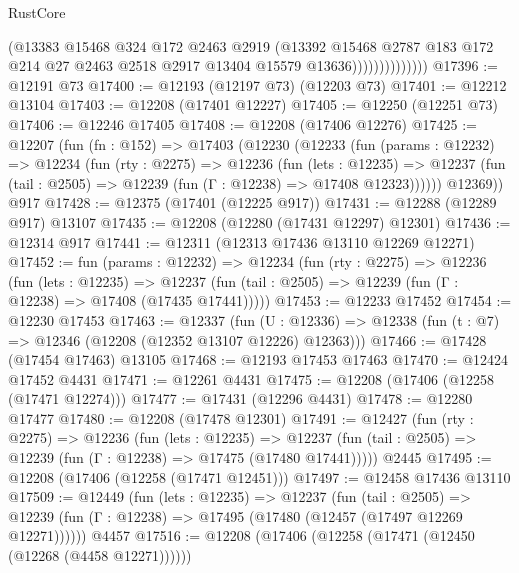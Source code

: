 \begin{lexlean}{RustCore}
\begin{coremodule}
                            (@13383
                              @15468
                              @324
                              @172
                              @2463
                              @2919
                              (@13392
                                @15468
                                @2787
                                @183
                                @172
                                @214
                                @27
                                @2463
                                @2518
                                @2917
                                @13404
                                @15579
                                @13636))))))))))))))
@17396 := @12191 @73
@17400 := @12193 (@12197 @73) (@12203 @73)
@17401 := @12212 @13104
@17403 := @12208 (@17401 @12227)
@17405 := @12250 (@12251 @73)
@17406 := @12246 @17405
@17408 := @12208 (@17406 @12276)
@17425 := @12207
    (fun (fn : @152) =>
    @17403
      (@12230
        (@12233
          (fun (params : @12232) =>
          @12234
            (fun (rty : @2275) =>
            @12236
              (fun (lets : @12235) =>
              @12237 (fun (tail : @2505) => @12239 (fun (Γ : @12238) => @17408 @12323))))))
        @12369))
    @917
@17428 := @12375 (@17401 (@12225 @917))
@17431 := @12288 (@12289 @917) @13107
@17435 := @12208 (@12280 (@17431 @12297) @12301)
@17436 := @12314 @917
@17441 := @12311 (@12313 @17436 @13110 @12269 @12271)
@17452 := fun (params : @12232) =>
  @12234
    (fun (rty : @2275) =>
    @12236
      (fun (lets : @12235) =>
      @12237 (fun (tail : @2505) => @12239 (fun (Γ : @12238) => @17408 (@17435 @17441)))))
@17453 := @12233 @17452
@17454 := @12230 @17453
@17463 := @12337
    (fun (U : @12336) => @12338 (fun (t : @7) => @12346 (@12208 (@12352 @13107 @12226) @12363)))
@17466 := @17428 (@17454 @17463) @13105
@17468 := @12193 @17453 @17463
@17470 := @12424 @17452 @4431
@17471 := @12261 @4431
@17475 := @12208 (@17406 (@12258 (@17471 @12274)))
@17477 := @17431 (@12296 @4431)
@17478 := @12280 @17477
@17480 := @12208 (@17478 @12301)
@17491 := @12427
    (fun (rty : @2275) =>
    @12236
      (fun (lets : @12235) =>
      @12237 (fun (tail : @2505) => @12239 (fun (Γ : @12238) => @17475 (@17480 @17441)))))
    @2445
@17495 := @12208 (@17406 (@12258 (@17471 @12451)))
@17497 := @12458 @17436 @13110
@17509 := @12449
    (fun (lets : @12235) =>
    @12237
      (fun (tail : @2505) =>
      @12239 (fun (Γ : @12238) => @17495 (@17480 (@12457 (@17497 @12269 @12271))))))
    @4457
@17516 := @12208 (@17406 (@12258 (@17471 (@12450 (@12268 (@4458 @12271))))))

\end{coremodule}
\end{lexlean}
